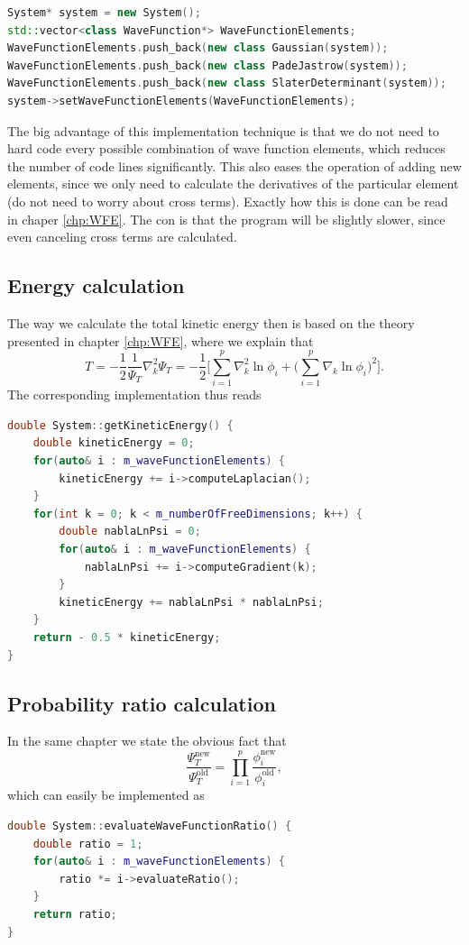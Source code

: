 \lstset{basicstyle=\scriptsize}
\begin{lstlisting}[language=c++,caption={from \texttt{main.cpp}}]
System* system = new System();
std::vector<class WaveFunction*> WaveFunctionElements;
WaveFunctionElements.push_back(new class Gaussian(system));
WaveFunctionElements.push_back(new class PadeJastrow(system));
WaveFunctionElements.push_back(new class SlaterDeterminant(system));
system->setWaveFunctionElements(WaveFunctionElements);
\end{lstlisting}

The big advantage of this implementation technique is that we do not need to hard code every possible combination of wave function elements, which reduces the number of code lines significantly. This also eases the operation of adding new elements, since we only need to calculate the derivatives of the particular element (do not need to worry about cross terms). Exactly how this is done can be read in chaper \ref{chp:WFE}. The con is that the program will be slightly slower, since even canceling cross terms are calculated.

\subsection{Energy calculation}
The way we calculate the total kinetic energy then is based on the theory presented in chapter \ref{chp:WFE}, where we explain that
\begin{equation}
T=-\frac{1}{2}\frac{1}{\Psi_T}\nabla_k^2\Psi_T=-\frac{1}{2}\bigg[\sum_{i=1}^p\nabla_k^2\ln\phi_i + \Big(\sum_{i=1}^p\nabla_k\ln\phi_i\Big)^2\bigg].
\end{equation}
The corresponding implementation thus reads
\lstset{basicstyle=\scriptsize}
\begin{lstlisting}[language=c++,caption={from \texttt{system.cpp}}]
double System::getKineticEnergy() {
    double kineticEnergy = 0;
    for(auto& i : m_waveFunctionElements) {
        kineticEnergy += i->computeLaplacian();
    }
    for(int k = 0; k < m_numberOfFreeDimensions; k++) {
        double nablaLnPsi = 0;
        for(auto& i : m_waveFunctionElements) {
            nablaLnPsi += i->computeGradient(k);
        }
        kineticEnergy += nablaLnPsi * nablaLnPsi;
    }
    return - 0.5 * kineticEnergy;
}
\end{lstlisting}

\subsection{Probability ratio calculation}
In the same chapter we state the obvious fact that 
\begin{equation*}
	\frac{\Psi_T^{\text{new}}}{\Psi_T^{\text{old}}}=\prod_{i=1}^p\frac{\phi_i^{\text{new}}}{\phi_i^{\text{old}}},
\end{equation*}
which can easily be implemented as
\lstset{basicstyle=\scriptsize}
\begin{lstlisting}[language=c++,caption={from \texttt{system.cpp}}]
double System::evaluateWaveFunctionRatio() {
    double ratio = 1;
    for(auto& i : m_waveFunctionElements) {
        ratio *= i->evaluateRatio();
    }
    return ratio;
}
\end{lstlisting}

